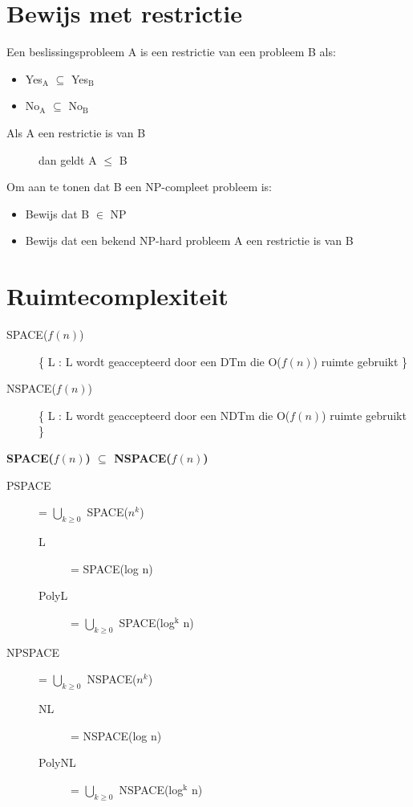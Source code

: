 \documentclass[]{article}
\begin{document}
\section*{Bewijs met restrictie}

Een beslissingsprobleem A is een restrictie van een probleem B als:

\begin{itemize}
\item Yes$_\text{A}$ $\subseteq$ Yes$_\text{B}$
\item No$_\text{A}$ $\subseteq$ No$_\text{B}$
\end{itemize}

\begin{description}
\item[Als A een restrictie is van B] dan geldt A $\leq$ B
\end{description}

Om aan te tonen dat B een NP-compleet probleem is:

\begin{itemize}
\item Bewijs dat B $\in$ NP
\item Bewijs dat een bekend NP-hard probleem A een restrictie is van B
\end{itemize}

\section*{Ruimtecomplexiteit}

\begin{description}
\item[SPACE($f(n)$)] \{ L : L wordt geaccepteerd door een DTm die O($f(n)$) ruimte gebruikt \}
\item[NSPACE($f(n)$)] \{ L : L wordt geaccepteerd door een NDTm die O($f(n)$) ruimte gebruikt \}
\end{description}

\medskip

\textbf{SPACE($f(n)$) $\subseteq$ NSPACE($f(n)$)}

\medskip

\begin{description}
\item[PSPACE] = $\bigcup_{k \geq 0}$ SPACE($n^k$)
\begin{description}
\item[L] = SPACE(log n)
\item[PolyL] = $\bigcup_{k \geq 0}$ SPACE(log$^\text{k}$ n)
\end{description}

\medskip

\item[NPSPACE] = $\bigcup_{k \geq 0}$ NSPACE($n^k$)
\begin{description}
\item[NL] = NSPACE(log n)
\item[PolyNL] = $\bigcup_{k \geq 0}$ NSPACE(log$^\text{k}$ n)
\end{description}
\end{description}
\end{document}
